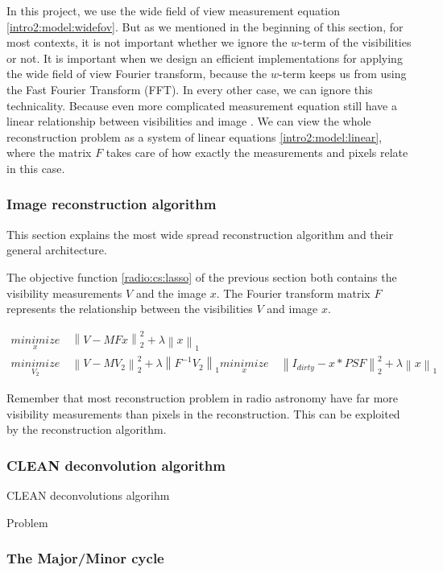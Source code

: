 In this project, we use the wide field of view measurement equation \eqref{intro2:model:widefov}. But as we mentioned in the beginning of this section, for most contexts, it is not important whether we ignore the $w$-term of the visibilities or not. It is important when we design an efficient implementations for applying the wide field of view Fourier transform, because the $w$-term keeps us from using the Fast Fourier Transform (FFT). In every other case, we can ignore this technicality. Because even more complicated measurement equation still have a linear relationship between visibilities and image \cite{smirnov2011revisiting1, smirnov2011revisiting2, smirnov2011revisiting3, smirnov2011revisiting4}. We can view the whole reconstruction problem as a system of linear equations \eqref{intro2:model:linear}, where the matrix $F$ takes care of how exactly the measurements and pixels relate in this case.



\subsubsection{Image reconstruction algorithm}\label{intro2:rec}
This section explains the most wide spread reconstruction algorithm and their general architecture. 

The objective function \eqref{radio:cs:lasso} of the previous section both contains the visibility measurements $V$ and the image $x$. The Fourier transform matrix $F$ represents the relationship between the visibilities $V$ and image $x$. 

\begin{equation}
\begin{split}
\underset{x}{minimize} &\: \left \| V - MFx \right \|_2^2 + \lambda \left \| x \right \|_1 \\
\underset{V_2}{minimize} &\: \left \| V - MV_2 \right \|_2^2 + \lambda \left \| F^{-1}V_2 \right \|_1
\underset{x}{minimize} &\: \left \| I_{dirty} - x * PSF \right \|_2^2 + \lambda \left \| x \right \|_1
\end{split}
\end{equation}



Remember that most reconstruction problem in radio astronomy have far more visibility measurements than pixels in the reconstruction. This can be exploited by the reconstruction algorithm. 

\subsubsection{CLEAN deconvolution algorithm}

CLEAN deconvolutions algorihm

Problem

\subsubsection{The Major/Minor cycle}\label{intro2:opt:cycle}


